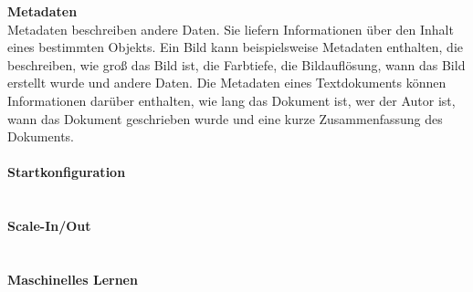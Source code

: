 \textbf{Metadaten}\\
Metadaten beschreiben andere Daten. Sie liefern Informationen über den Inhalt eines bestimmten Objekts. Ein Bild kann beispielsweise Metadaten enthalten, die beschreiben, wie groß das Bild ist, die Farbtiefe, die Bildauflösung, wann das Bild erstellt wurde und andere Daten. Die Metadaten eines Textdokuments können Informationen darüber enthalten, wie lang das Dokument ist, wer der Autor ist, wann das Dokument geschrieben wurde und eine kurze Zusammenfassung des Dokuments.
\\\\
\textbf{Startkonfiguration}\\ %
\\\\
\textbf{Scale-In/Out}\\
\\\\
\textbf{Maschinelles Lernen}\\
